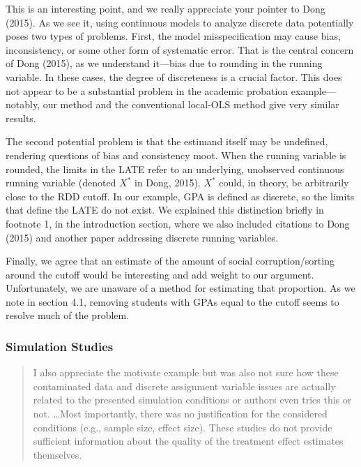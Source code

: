 \documentclass[12pt]{article}
\begin{document}
This is an interesting point, and we really appreciate your pointer to
Dong (2015). As we see it, using continuous models to analyze discrete
data potentially poses two types of problems. First, the model
misspecification may cause bias, inconsistency, or some other form of
systematic error. That is the central concern of Dong (2015), as we
understand it---bias due to rounding in the running variable. In these
cases, the degree of discreteness is a crucial factor. This does not
appear to be a substantial problem in the academic probation
example---notably, our method and the conventional local-OLS method
give very similar results.

The second potential problem is that the estimand itself may be
undefined, rendering questions of bias and consistency moot. When the running variable is
rounded, the limits in the LATE refer to an underlying, unobserved
continuous running variable (denoted $X^*$ in Dong, 2015). $X^*$
could, in theory, be arbitrarily close to the RDD cutoff. In our
example, GPA is defined as discrete, so the limits that define the
LATE do not exist. We explained this distinction briefly in footnote
1, in the introduction section, where we also included citations to
Dong (2015) and another paper addressing discrete running variables.

Finally, we agree that an estimate of the amount of social
corruption/sorting around the cutoff would be interesting and add
weight to our argument. Unfortunately, we are unaware of a method for
estimating that proportion. As we note in section 4.1, removing
students with GPAs equal to the cutoff seems to resolve much of the
problem.



\subsubsection{ Simulation Studies}

\begin{quote}
I also appreciate the motivate example but was also not sure how these
contaminated data and discrete assignment variable issues are actually
related to the presented simulation conditions or authors even tries
this or not. \dots Most importantly, there was no justification for the considered
conditions (e.g., sample size, effect size). These studies do not
provide sufficient information about the quality of the treatment
effect estimates themselves.
\end{quote}
\end{document}

